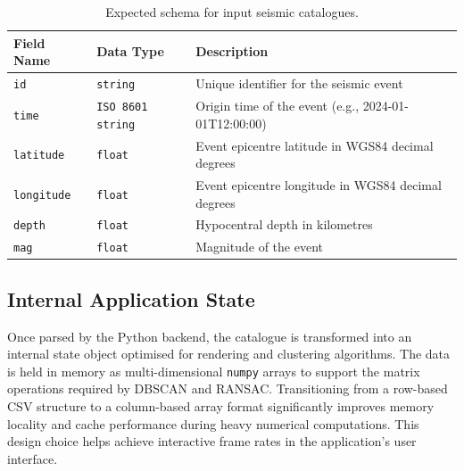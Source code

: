 \begin{table}[htbp]
\centering
\caption{Expected schema for input seismic catalogues.}
\label{tab:csv-schema}
\footnotesize
\renewcommand{\arraystretch}{1.15}
\begin{tabularx}{\textwidth}{@{}l l >{\raggedright\arraybackslash}X@{}}
\toprule
\textbf{Field Name} & \textbf{Data Type} & \textbf{Description} \\
\midrule
\texttt{id} & \texttt{string} & Unique identifier for the seismic event \\
\texttt{time} & \texttt{ISO 8601 string} & Origin time of the event (e.g., 2024-01-01T12:00:00) \\
\texttt{latitude} & \texttt{float} & Event epicentre latitude in WGS84 decimal degrees \\
\texttt{longitude} & \texttt{float} & Event epicentre longitude in WGS84 decimal degrees \\
\texttt{depth} & \texttt{float} & Hypocentral depth in kilometres \\
\texttt{mag} & \texttt{float} & Magnitude of the event \\
\bottomrule
\end{tabularx}
\end{table}

\subsection{Internal Application State}

Once parsed by the Python backend, the catalogue is transformed into an internal state object optimised for rendering and clustering algorithms. The data is held in memory as multi-dimensional \texttt{numpy} arrays to support the matrix operations required by DBSCAN and RANSAC. Transitioning from a row-based CSV structure to a column-based array format significantly improves memory locality and cache performance during heavy numerical computations. This design choice helps achieve interactive frame rates in the application's user interface.

